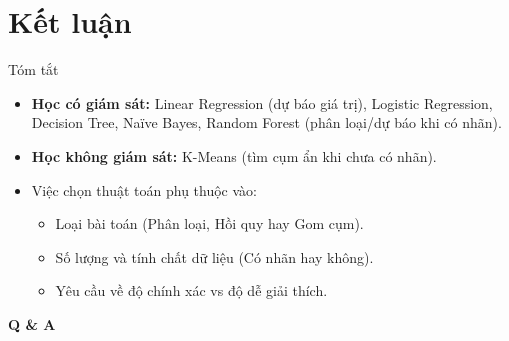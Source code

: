 \documentclass[aspectratio=169]{beamer}
\begin{document}
\section{Kết luận}
\begin{frame}{Tóm tắt}
    \begin{itemize}
        \item \textbf{Học có giám sát:} Linear Regression (dự báo giá trị), Logistic Regression, Decision Tree, Naïve Bayes, Random Forest (phân loại/dự báo khi có nhãn).
        \item \textbf{Học không giám sát:} K-Means (tìm cụm ẩn khi chưa có nhãn).
        \item Việc chọn thuật toán phụ thuộc vào: 
        \begin{itemize}
            \item Loại bài toán (Phân loại, Hồi quy hay Gom cụm).
            \item Số lượng và tính chất dữ liệu (Có nhãn hay không).
            \item Yêu cầu về độ chính xác vs độ dễ giải thích.
        \end{itemize}
    \end{itemize}
\end{frame}

\begin{frame}
    \begin{center}
        \Huge \textbf{Q \& A}
    \end{center}
\end{frame}
\end{document}
